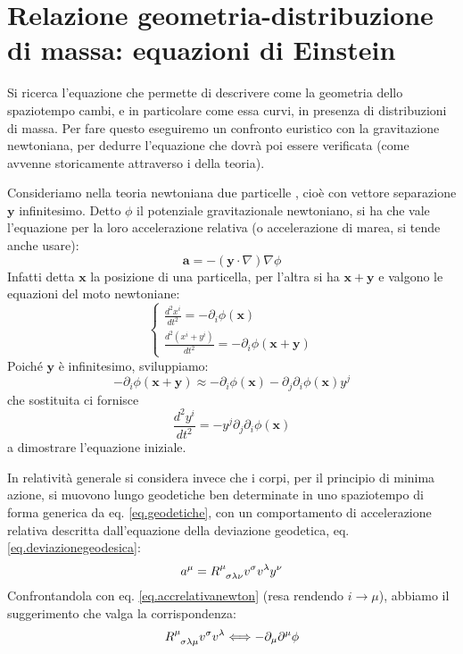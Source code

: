 \section{Relazione geometria-distribuzione di massa: equazioni di Einstein}
Si ricerca l'equazione che permette di descrivere come la geometria dello spaziotempo cambi, e in particolare come essa curvi, in presenza di distribuzioni di massa. Per fare questo eseguiremo un confronto euristico con la gravitazione newtoniana, per dedurre l'equazione che dovrà poi essere verificata (come avvenne storicamente attraverso i  della teoria).

Consideriamo nella teoria newtoniana due particelle , cioè con vettore separazione $\bm{y}$ infinitesimo. Detto $\phi$ il potenziale gravitazionale newtoniano, si ha che vale l'equazione per la loro accelerazione relativa (o accelerazione di marea, si tende anche usare):
\begin{equation}
    \bm{a} = -(\bm{y}\cdot \nabla) \nabla\phi
    \label{eq.accrelativanewton}
\end{equation}
Infatti detta $\bm{x}$ la posizione di una particella, per l'altra si ha $\bm{x} + \bm{y}$ e valgono le equazioni del moto newtoniane:
\begin{equation*}
    \left\{\begin{array}{l}
        \frac{d^2 x^i}{dt^2} = - \partial_i \phi (\bm{x}) \\
         \frac{d^2 (x^i+ y^i)}{dt^2} = - \partial_i \phi (\bm{x}+\bm{y})
    \end{array}\right.
\end{equation*}
Poiché $\bm{y}$ è infinitesimo, sviluppiamo:
\begin{equation*}
    - \partial_i \phi (\bm{x}+\bm{y}) \approx - \partial_i \phi (\bm{x}) -\partial_j \partial_i \phi(\bm{x}) y^j
\end{equation*}
che sostituita ci fornisce
\begin{equation*}
    \frac{d^2 y^i}{dt^2} = - y^j \partial_j \partial_i \phi(\bm{x})
\end{equation*}
a dimostrare l'equazione iniziale.

In relatività generale si considera invece che i corpi, per il principio di minima azione, si muovono lungo geodetiche ben determinate in uno spaziotempo di forma generica da eq. \ref{eq.geodetiche}, con un comportamento di accelerazione relativa descritta dall'equazione della deviazione geodetica, eq. \ref{eq.deviazionegeodesica}:
\begin{equation*}
    a^\mu =\tensor{R}{^\mu_{\sigma\lambda\nu}}v^\sigma v^\lambda y^\nu
    \label{eq.accrelativaGR}
\end{equation*}
Confrontandola con eq. \ref{eq.accrelativanewton} (resa  rendendo $i\rightarrow \mu$), abbiamo il suggerimento che valga la corrispondenza:
\begin{equation}
    \tensor{R}{^\mu_{\sigma\lambda\mu}}v^\sigma v^\lambda \Longleftrightarrow -\partial_\mu \partial^\mu \phi
    \label{eq.primacorrispondenzaGR}
\end{equation}

